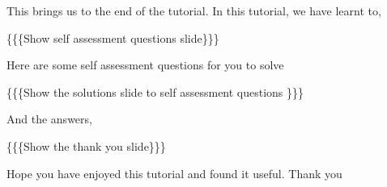 \documentclass[a4paper,english]{article}
\begin{document}

This brings us to the end of the tutorial. In this tutorial, we have
learnt to,


\{\{\{Show self assessment questions slide\}\}\}


Here are some self assessment questions for you to solve


\{\{\{Show the solutions slide to self assessment questions \}\}\}


And the answers,


\{\{\{Show the thank you slide\}\}\}


Hope you have enjoyed this tutorial and found it useful.
Thank you
\end{document}

